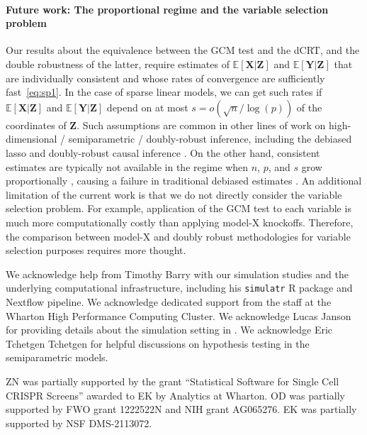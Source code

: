 \documentclass[aos]{imsart}
\theoremstyle{plain}
\theoremstyle{remark}
\newcommand{\E}{\mathbb E}								%
\newcommand{\prx}{\bm X}								%
\newcommand{\prz}{\bm Z}								%
\newcommand{\pry}{{\bm Y}}								%
\begin{document}
\paragraph*{Future work: The proportional regime and the variable selection problem} 

Our results about the equivalence between the GCM test and the dCRT, and the double robustness of the latter, require estimates of $\E[\prx|\prz]$ and $\E[\pry|\prz]$ that are individually consistent and whose rates of convergence are sufficiently fast~\eqref{eq:sp1}. In the case of sparse linear models, we can get such rates if $\E[\prx|\prz]$ and $\E[\pry|\prz]$ depend on at most $s = o(\sqrt{n}/\log(p))$ of the coordinates of $\prz$. Such assumptions are common in other lines of work on high-dimensional / semiparametric / doubly-robust inference, including the debiased lasso \citep{VanDeGeer2014, ZZ14, Javanmard2014, Ning2017, Jankova2018a} and doubly-robust causal inference \citep{BetH14, Chernozhukov2018}. On the other hand, consistent estimates are typically not available in the regime when $n$, $p$, and $s$ grow proportionally \citep{Bayati2011}, causing a failure in traditional debiased estimates \citep{Celentano2021}. An additional limitation of the current work is that we do not directly consider the variable selection problem. For example, application of the GCM test to each variable is much more computationally costly than applying model-X knockoffs. Therefore, the comparison between model-X and doubly robust methodologies for variable selection purposes requires more thought.

\begin{acks}[Acknowledgments]
    We acknowledge help from Timothy Barry with our simulation studies and the underlying computational infrastructure, including his \verb|simulatr| R package and Nextflow pipeline. We acknowledge dedicated support from the staff at the Wharton High Performance Computing Cluster. We acknowledge Lucas Janson for providing details about the simulation setting in \citet{CetL16}. We acknowledge Eric Tchetgen Tchetgen for helpful discussions on hypothesis testing in the semiparametric models.
    \end{acks}
    \begin{funding}
        ZN was partially supported by the grant ``Statistical Software for Single Cell CRISPR Screens'' awarded to EK by Analytics at Wharton. OD was partially supported by FWO grant 1222522N and NIH grant AG065276. EK was partially supported by NSF DMS-2113072.  
    \end{funding}
    
\end{document}
